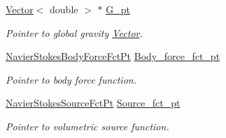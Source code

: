 \begin{DoxyCompactItemize}
\hyperlink{classoomph_1_1Vector}{Vector}$<$ double $>$ $\ast$ \hyperlink{classoomph_1_1PolarNavierStokesEquations_a31ccd82266f001f15ce0a6a32b807c44}{G\+\_\+pt}
\begin{DoxyCompactList}\small\item\em Pointer to global gravity \hyperlink{classoomph_1_1Vector}{Vector}. \end{DoxyCompactList}\item 
\hyperlink{classoomph_1_1PolarNavierStokesEquations_adfe008551ad8039abe5c9bf23af8c0e3}{Navier\+Stokes\+Body\+Force\+Fct\+Pt} \hyperlink{classoomph_1_1PolarNavierStokesEquations_a49167de70c6cd7bab35cc76ef01be803}{Body\+\_\+force\+\_\+fct\+\_\+pt}
\begin{DoxyCompactList}\small\item\em Pointer to body force function. \end{DoxyCompactList}\item 
\hyperlink{classoomph_1_1PolarNavierStokesEquations_a9084ecf962b26ccaa72443a807dedb25}{Navier\+Stokes\+Source\+Fct\+Pt} \hyperlink{classoomph_1_1PolarNavierStokesEquations_ab33675bd49ce0e250e58e26cc02f920c}{Source\+\_\+fct\+\_\+pt}
\begin{DoxyCompactList}\small\item\em Pointer to volumetric source function. \end{DoxyCompactList}\end{DoxyCompactItemize}
